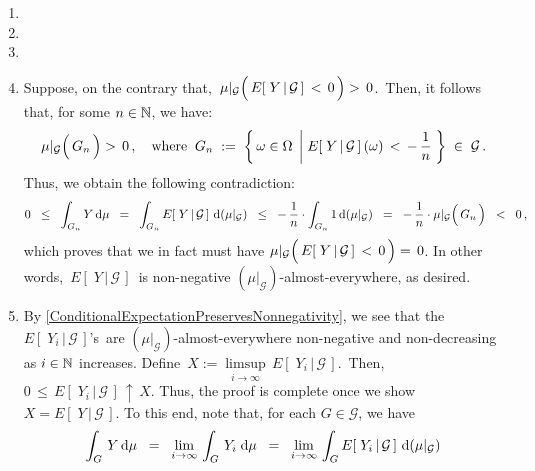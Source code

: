 \begin{enumerate}
\item
\item
\item
\item
	Suppose, on the contrary that,
	\,$\mu\vert_{\mathcal{G}}\!\left(\,\overset{{\color{white}.}}{E}\!\left[\;Y\,\vert\,\mathcal{G}\,\right]\,<\,0\,\right) >\,0$.\,
	Then, it follows that, for some $n \in \mathbb{N}$, we have:
	\begin{equation*}
	\mu\vert_{\mathcal{G}}\!\left(\,\overset{{\color{white}.}}{G}_{n}\,\right) >\,0\,,
	\quad\textnormal{where}\;\;
	G_{n} \; :=\; \left\{\,
		\omega\in\Omega
		\;\left\vert\;
		\overset{{\color{white}.}}{E}\!\left[\;Y\,\vert\,\mathcal{G}\,\right](\omega)\,<\,-\,\dfrac{1}{n}
		\right.\,\right\}
		\;\in\;\mathcal{G}\,.
	\end{equation*}
	Thus, we obtain the following contradiction:
	\begin{equation*}
	0 \;\;\leq\;\; \int_{G_{n}} Y\,\d\mu
	\;\;=\;\; \int_{G_{n}} E\!\left[\;Y\,\vert\,\mathcal{G}\,\right]\,\d(\mu\vert_{\mathcal{G}})
	\;\;\leq\;\; -\,\dfrac{1}{n} \cdot \int_{G_{n}} 1\,\d(\mu\vert_{\mathcal{G}})
	\;\;=\;\; -\,\dfrac{1}{n} \cdot \mu\vert_{\mathcal{G}}\!\left(\,\overset{{\color{white}.}}{G}_{n}\,\right)
	\;\; < \;\; 0\,,
	\end{equation*}
	which proves that we in fact must have
	$\mu\vert_{\mathcal{G}}\!\left(\,\overset{{\color{white}.}}{E}\!\left[\;Y\,\vert\,\mathcal{G}\,\right]\,<\,0\,\right) =\,0$.
	In other words, \,$E\!\left[\;Y\,\vert\,\mathcal{G}\,\right]$\, is non-negative
	$(\mu\vert_{\mathcal{G}})$-almost-everywhere, as desired.
\item
	By \eqref{ConditionalExpectationPreservesNonnegativity}, we see that the
	\,$E\!\left[\;Y_{i}\,\vert\,\mathcal{G}\,\right]$'s\,
	are $(\mu\vert_{\mathcal{G}})$-almost-everywhere non-negative and non-decreasing as $i \in \mathbb{N}$ increases.
	Define \,$X := \underset{i\rightarrow\infty}{\limsup}\,E\!\left[\;Y_{i}\,\vert\,\mathcal{G}\,\right]$.\,
	Then, \,$0\,\leq\,E\!\left[\;Y_{i}\,\vert\,\mathcal{G}\,\right] \,\uparrow\, X$.
	Thus, the proof is complete once we show $X = E\!\left[\;Y\,\vert\,\mathcal{G}\,\right]$.
	To this end, note that, for each $G \in \mathcal{G}$, we have
	\begin{equation*}
	\int_{G}\,Y\,\d\mu
	\;\;=\;\;
	\underset{i\rightarrow\infty}{\lim}\,\int_{G}\,Y_{i}\;\d\mu
	\;\;=\;\;
	\underset{i\rightarrow\infty}{\lim}\,\int_{G}E\!\left[\;Y_{i}\,\vert\,\mathcal{G}\,\right]\,\d(\mu\vert_{\mathcal{G}})

\end{equation*}
\end{enumerate}
